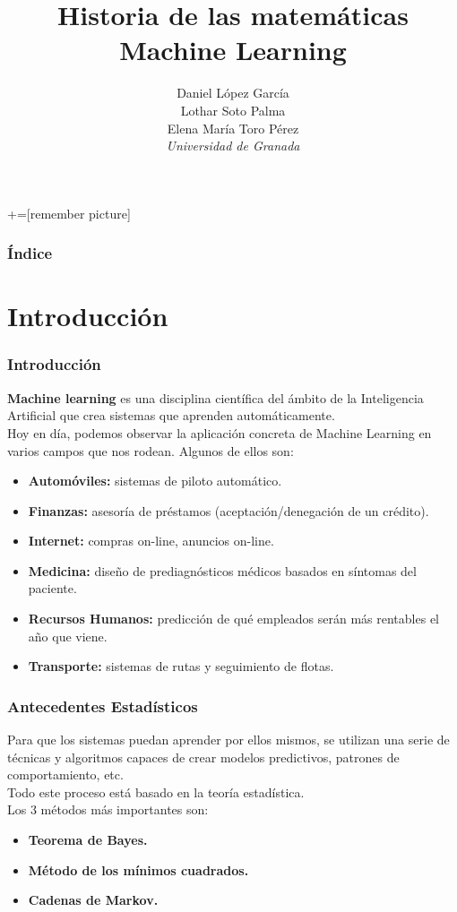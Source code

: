 \documentclass[9pt]{beamer} %
\author{Daniel López García\\ Lothar Soto Palma\\ Elena María Toro Pérez\\\textit{Universidad de Granada}}
\title{Historia de las matemáticas\\ Machine Learning}
\begin{document}
+=[remember picture]

\everymath{\displaystyle}

\begin{frame}
\titlepage
\end{frame}

\begin{frame}
\frametitle{Índice}
\tableofcontents
\end{frame}

\section{Introducción}
	\begin{frame}
	\frametitle{Introducción}
    \textbf{Machine learning} es una disciplina científica del ámbito de la Inteligencia Artificial que crea sistemas que aprenden automáticamente.\\
	
	Hoy en día, podemos observar la aplicación concreta de Machine Learning en varios campos que nos rodean. Algunos de ellos son:
		\begin{itemize}
		    \item \textbf{Automóviles:} sistemas de piloto automático.
		    \item \textbf{Finanzas:} asesoría de préstamos (aceptación/denegación de un crédito).
		    \item \textbf{Internet:} compras on-line, anuncios on-line.
		    \item \textbf{Medicina:} diseño de prediagnósticos médicos basados en síntomas del paciente.
		    \item \textbf{Recursos Humanos:} predicción de qué empleados serán más rentables el año que viene.
		    \item \textbf{Transporte:} sistemas de rutas y seguimiento de flotas.
		\end{itemize}
	\end{frame}
	
	\begin{frame}
	\frametitle{Antecedentes Estadísticos}
	Para que los sistemas puedan aprender por ellos mismos, se utilizan una serie de técnicas y algoritmos capaces de crear modelos predictivos, patrones de comportamiento, etc.\\
	
	Todo este proceso está basado en la teoría estadística.\\
	
	
	Los 3 métodos más importantes son:
	\begin{itemize}
	    \item \textbf{Teorema de Bayes.}
	    \item \textbf{Método de los mínimos cuadrados.}
	    \item \textbf{Cadenas de Markov.}
	\end{itemize}
	\end{frame}
	
\end{document}
